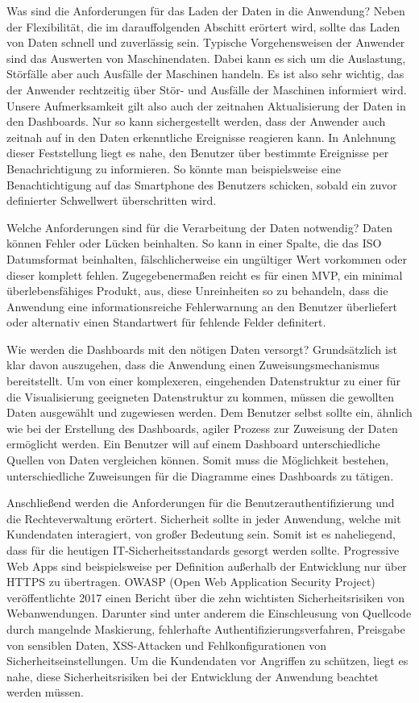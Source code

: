 Was sind die Anforderungen für das Laden der Daten in die Anwendung? Neben der Flexibilität,
die im darauffolgenden Abschitt erörtert wird, sollte das Laden von Daten schnell und zuverlässig
sein. Typische Vorgehensweisen der Anwender sind das Auswerten von Maschinendaten. Dabei kann es
sich um die Auslastung, Störfälle aber auch Ausfälle der Maschinen handeln. Es ist also sehr wichtig,
das der Anwender rechtzeitig über Stör- und Ausfälle der Maschinen informiert wird. Unsere
Aufmerksamkeit gilt also auch der zeitnahen Aktualisierung der Daten in den Dashboards. Nur
so kann sichergestellt werden, dass der Anwender auch zeitnah auf in den Daten erkenntliche
Ereignisse reagieren kann. In Anlehnung dieser Feststellung liegt es nahe, den Benutzer
über bestimmte Ereignisse per Benachrichtigung zu informieren. So könnte man beispielsweise
eine Benachtichtigung auf das Smartphone des Benutzers schicken, sobald ein zuvor definierter
Schwellwert überschritten wird.

Welche Anforderungen sind für die Verarbeitung der Daten notwendig? Daten können Fehler oder Lücken
beinhalten. So kann in einer Spalte, die das ISO Datumsformat beinhalten, fälschlicherweise ein
ungültiger Wert vorkommen oder dieser komplett fehlen. Zugegebenermaßen reicht es für einen MVP, ein
minimal überlebensfähiges Produkt, aus, diese Unreinheiten so zu behandeln, dass die Anwendung
eine informationsreiche Fehlerwarnung an den Benutzer überliefert oder alternativ einen Standartwert
für fehlende Felder definitert.

Wie werden die Dashboards mit den nötigen Daten versorgt? Grundsätzlich ist klar davon auszugehen,
dass die Anwendung einen Zuweisungsmechanismus bereitstellt. Um von einer komplexeren, eingehenden
Datenstruktur zu einer für die Visualisierung geeigneten Datenstruktur zu kommen, müssen die gewollten
Daten ausgewählt und zugewiesen werden. Dem Benutzer selbst sollte ein, ähnlich wie bei der Erstellung
des Dashboards, agiler Prozess zur Zuweisung der Daten ermöglicht werden. Ein Benutzer will auf einem
Dashboard unterschiedliche Quellen von Daten vergleichen können. Somit muss die Möglichkeit bestehen,
unterschiedliche Zuweisungen für die Diagramme eines Dashboards zu tätigen.

Anschließend werden die Anforderungen für die Benutzerauthentifizierung und die Rechteverwaltung erörtert.
Sicherheit sollte in jeder Anwendung, welche mit Kundendaten interagiert, von großer Bedeutung sein.
Somit ist es naheliegend, dass für die heutigen IT-Sicherheitsstandards gesorgt werden sollte. Progressive
Web Apps sind beispielsweise per Definition außerhalb der Entwicklung nur über HTTPS zu übertragen.\cite[S. 16]{KevinFrankPWAMasterarbeit}
OWASP (Open Web Application Security Project) veröffentlichte 2017 einen Bericht über die zehn
wichtisten Sicherheitsrisiken von Webanwendungen. Darunter sind unter anderem die Einschleusung
von Quellcode durch mangelnde Maskierung, fehlerhafte Authentifizierungsverfahren, Preisgabe von sensiblen Daten,
XSS-Attacken und Fehlkonfigurationen von Sicherheitseinstellungen.\cite[S. 4]{OWASPTopTen}
Um die Kundendaten vor Angriffen zu schützen, liegt es nahe, diese Sicherheitsrisiken bei der
Entwicklung der Anwendung beachtet werden müssen. 

